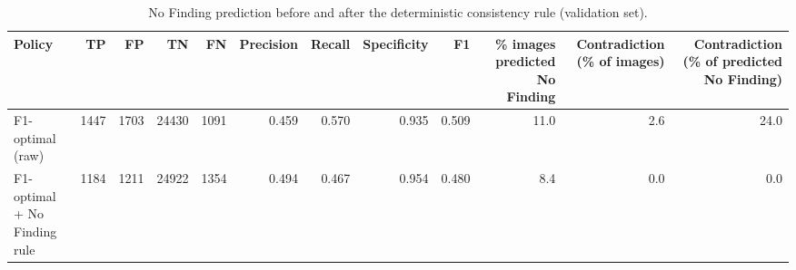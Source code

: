 \begin{table}[t]
\centering
\small
\begin{tabular}{lrrrrrrrrrrr}
\hline
Policy & TP & FP & TN & FN & Precision & Recall & Specificity & F1 & \% images predicted No Finding & Contradiction (\% of images) & Contradiction (\% of predicted No Finding) \\
\hline
F1-optimal (raw) & 1447 & 1703 & 24430 & 1091 & 0.459 & 0.570 & 0.935 & 0.509 & 11.0 & 2.6 & 24.0 \\
F1-optimal + No Finding rule & 1184 & 1211 & 24922 & 1354 & 0.494 & 0.467 & 0.954 & 0.480 & 8.4 & 0.0 & 0.0 \\
\hline
\end{tabular}
\caption{No Finding prediction before and after the deterministic consistency rule (validation set).}
\label{tab:table4_no_finding_consistency}
\end{table}
